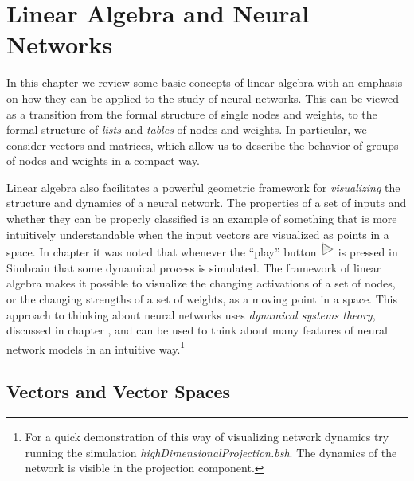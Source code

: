 \chapter{Linear Algebra and Neural Networks}\label{ch_linear_algebra}




   In this chapter we review some basic concepts of linear algebra with an 
emphasis on how they can be applied to the study of neural networks. This can be viewed as a transition from the formal structure of single nodes and weights, to the formal 
structure of \emph{lists} and \emph{tables} of nodes and weights. In particular, we  consider vectors and matrices, which allow us to describe the behavior of groups of nodes 
and weights in a compact way.

Linear algebra also facilitates a powerful geometric framework for \emph{visualizing} the structure and dynamics of a neural network. The properties of a set of inputs and whether they can be properly classified is an example of something that is  more intuitively understandable when the input vectors are visualized as points in a space. In chapter  it was  noted that whenever the ``play''  button \includegraphics[scale=.5]{./images/Play.png} is pressed in Simbrain that some dynamical process is simulated. The framework of linear algebra makes it possible to visualize the changing activations of a set of nodes, or the changing strengths of a set of weights, as a moving point in a space. This approach to thinking about neural networks uses \emph{dynamical systems theory}, discussed in chapter , and can be used to think about many features of neural network models in an intuitive way.\footnote{For a quick demonstration of this way of visualizing network dynamics try running the simulation \emph{highDimensionalProjection.bsh}. The dynamics of the network is visible in the projection component.}  

\section{Vectors and Vector Spaces}


